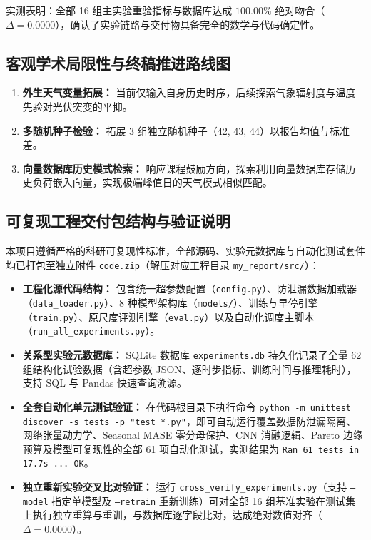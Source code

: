 \documentclass[11pt,a4paper,UTF8]{ctexart}
\begin{document}
\noindent 实测表明：全部 16 组主实验重验指标与数据库达成 $\mathbf{100.00\%}$ 绝对吻合（$\Delta = 0.0000$），确认了实验链路与交付物具备完全的数学与代码确定性。

\subsection{客观学术局限性与终稿推进路线图}
\begin{enumerate}
    \item \textbf{外生天气变量拓展：} 当前仅输入自身历史时序，后续探索气象辐射度与温度先验对光伏突变的平抑。
    \item \textbf{多随机种子检验：} 拓展 3 组独立随机种子（42, 43, 44）以报告均值与标准差。
    \item \textbf{向量数据库历史模式检索：} 响应课程鼓励方向，探索利用向量数据库存储历史负荷嵌入向量，实现极端峰值日的天气模式相似匹配。
\end{enumerate}

\subsection{可复现工程交付包结构与验证说明}
本项目遵循严格的科研可复现性标准，全部源码、实验元数据库与自动化测试套件均已打包至独立附件 \texttt{code.zip}（解压对应工程目录 \texttt{my\_report/src/}）：
\begin{itemize}
    \item \textbf{工程化源代码结构：} 包含统一超参数配置（\texttt{config.py}）、防泄漏数据加载器（\texttt{data\_loader.py}）、8 种模型架构库（\texttt{models/}）、训练与早停引擎（\texttt{train.py}）、原尺度评测引擎（\texttt{eval.py}）以及自动化调度主脚本（\nolinkurl{run_all_experiments.py}）。
    \item \textbf{关系型实验元数据库：} SQLite 数据库 \texttt{experiments.db} 持久化记录了全量 62 组结构化试验数据（含超参数 JSON、逐时步指标、训练时间与推理耗时），支持 SQL 与 Pandas 快速查询溯源。
    \item \textbf{全套自动化单元测试验证：} 在代码根目录下执行命令 \texttt{python -m unittest discover -s tests -p "test\_*.py"}，即可自动运行覆盖数据防泄漏隔离、网络张量动力学、Seasonal MASE 零分母保护、CNN 消融逻辑、Pareto 边缘预算及模型可复现性的全部 61 项自动化测试，实测结果为 \texttt{Ran 61 tests in 17.7s ... OK}。
    \item \textbf{独立重新实验交叉比对验证：} 运行 \nolinkurl{cross_verify_experiments.py}（支持 \texttt{--model} 指定单模型及 \texttt{--retrain} 重新训练）可对全部 16 组基准实验在测试集上执行独立重算与重训，与数据库逐字段比对，达成绝对数值对齐（$\Delta = 0.0000$）。
\end{itemize}
\end{document}
